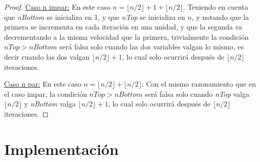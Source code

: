 \documentclass[11pt,a4paper,twoside]{tesis}
\newcommand{\parteEntera}{\lfloor n/2 \rfloor}
\newcommand{\nBottom}{\textit{nBottom }}
\newcommand{\nTop}{\textit{nTop }}
\begin{document}
\begin{proof}
\underline{Caso n impar:} En este caso $n = \parteEntera + 1 + \parteEntera$. Teniendo en cuenta que \nBottom se inicializa en 1, y que \nTop se inicializa en $n$, y notando que la primera se incrementa en cada iteración en una unidad, y que la segunda va decrementando a la misma velocidad que la primera, trivialmente la condición $nTop > nBottom$ será falsa solo cuando las dos variables valgan lo mismo, es decir cuando las dos valgan $\parteEntera + 1$, lo cual solo ocurrirá después de $\parteEntera$ iteraciones. 

\underline{Caso n par:} En este caso $n = \parteEntera + \parteEntera$. Con el mismo razonamiento que en el caso impar, la condición $nTop > nBottom$ será falsa solo cuando \nTop valga $\parteEntera$ y \nBottom valga $\parteEntera + 1$, lo cual solo ocurrirá después de $\parteEntera$ iteraciones. 

\end{proof}

















\chapter{Implementación}
\end{document}
